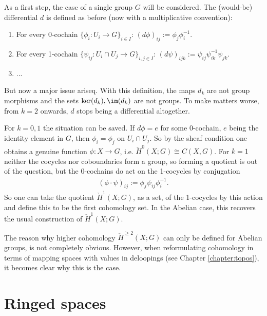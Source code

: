     As a first step, the case of a single group $G$ will be considered. The (would-be) differential $d$ is defined as before (now with a multiplicative convention):
    \begin{enumerate}
        \item For every 0-cochain $\{\phi_i:U_i\rightarrow G\}_{i\in I}$: $(d\phi)_{ij}:=\phi_j\phi^{-1}_i$.
        \item For every 1-cochain $\{\psi_{ij}:U_i\cap U_j\rightarrow G\}_{i,j\in I}$: $(d\psi)_{ijk} := \psi_{ij}\psi^{-1}_{ik}\psi_{jk}$.
        \item ...
    \end{enumerate}
    But now a major issue ariseq. With this definition, the maps $d_k$ are not group morphisms and the sets $\ker(d_k),\im(d_k)$ are not groups. To make matters worse, from $k=2$ onwards, $d$ stops being a differential altogether.

    For $k=0,1$ the situation can be saved. If $d\phi=e$ for some 0-cochain, $e$ being the identity element in $G$, then $\phi_i=\phi_j$ on $U_i\cap U_j$. So by the sheaf condition one obtains a genuine function $\phi:X\rightarrow G$, i.e. $\check{H}^0(X;G)\cong C(X,G)$. For $k=1$ neither the cocycles nor coboundaries form a group, so forming a quotient is out of the question, but the 0-cochains do act on the 1-cocycles by conjugation
    \begin{gather}
        (\phi\cdot\psi)_{ij} := \phi_j\psi_{ij}\phi^{-1}_i.
    \end{gather}
    So one can take the quotient $\check{H}^1(X;G)$, as a set, of the 1-cocycles by this action and define this to be the first cohomology set. In the Abelian case, this recovers the usual construction of $\check{H}^1(X;G)$.

    \begin{remark*}
        The reason why higher cohomology $\check{H}^{\geq2}(X;G)$ can only be defined for Abelian groups, is not completely obvious. However, when reformulating cohomology in terms of mapping spaces with values in deloopings (see Chapter \ref{chapter:topos}), it becomes clear why this is the case.
    \end{remark*}

\section{Ringed spaces}



